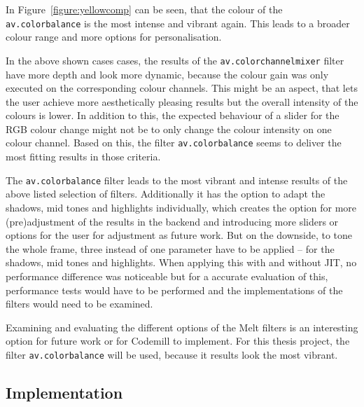 \documentclass[../MasterThesis.tex]{subfiles}
\begin{document}
In Figure~\ref{figure:yellowcomp} can be seen, that the colour of the \texttt{av.colorbalance} is the most intense and vibrant again. This leads to a broader colour range and more options for personalisation.

In the above shown cases cases, the results of the \texttt{av.colorchannelmixer} filter have more depth and look more dynamic, because the colour gain was only executed on the corresponding colour channels. This might be an aspect, that lets the user achieve more aesthetically pleasing results but the overall intensity of the colours is lower. In addition to this, the expected behaviour of a slider for the RGB colour change might not be to only change the colour intensity on one colour channel. Based on this, the filter \texttt{av.colorbalance} seems to deliver the most fitting results in those criteria.




The \texttt{av.colorbalance} filter leads to the most vibrant and intense results of the above listed selection of filters. Additionally it has the option to adapt the shadows, mid tones and highlights individually, which creates the option for more (pre)adjustment of the results in the backend and introducing more sliders or options for the user for adjustment as future work.
But on the downside, to tone the whole frame, three instead of one parameter have to be applied -- for the shadows, mid tones and highlights.
When applying this with and without JIT, no performance difference was noticeable but for a accurate evaluation of this, performance tests would have to be performed and the implementations of the filters would need to be examined.

Examining and evaluating the different options of the Melt filters is an interesting option for future work or for Codemill to implement. For this thesis project, the filter \texttt{av.colorbalance} will be used, because it results look the most vibrant.










\newpage
\subsection{Implementation} \label{subsection:implementation}








	
	
	
\end{document}
